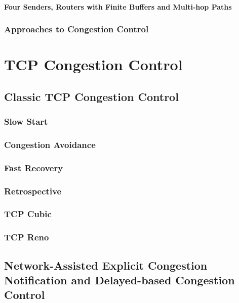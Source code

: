 \documentclass[12pt letter]{report}
\begin{document}
\subsubsection{Four Senders, Routers with Finite Buffers and Multi-hop Paths}

\subsection{Approaches to Congestion Control}

\chapter{TCP Congestion Control}

\section{Classic TCP Congestion Control}

\subsection{Slow Start}

\subsection{Congestion Avoidance}

\subsection{Fast Recovery}

\subsection{Retrospective}

\subsection{TCP Cubic}

\subsection{TCP Reno}

\section{Network-Assisted Explicit Congestion Notification and
Delayed-based Congestion Control}
\end{document}
